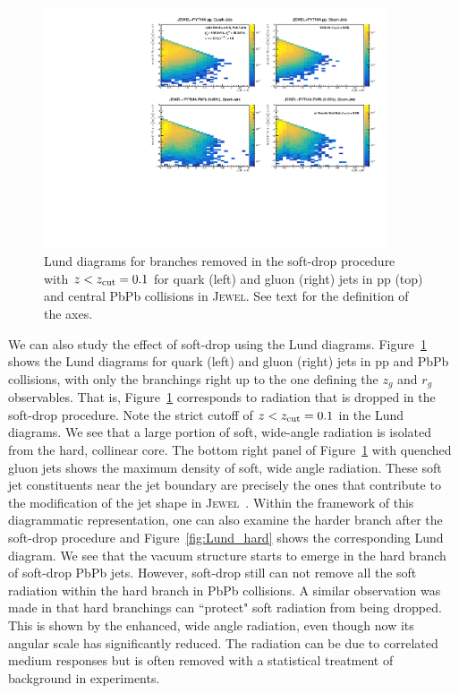 \documentclass[notoc,preprintnumbers]{JHEP3}
\newcommand{\jw}{\textsc{Jewel}~}
\begin{document}
\begin{figure}[t]
	\centering
	\includegraphics[width=0.9\textwidth]{Fig11}
	\caption{Lund diagrams for branches removed in the soft-drop procedure with $z<z_{\rm cut}=0.1$ for quark (left) and gluon (right) jets in pp (top) and central PbPb collisions in \textsc{Jewel}. See text for the definition of the axes.}
\label{fig:Lund_bkg}
\end{figure}

We can also study the effect of soft-drop using the Lund diagrams. Figure~\ref{fig:Lund_bkg} shows the Lund diagrams for quark (left) and gluon (right) jets in pp and PbPb collisions, with only the branchings right up to the one defining the $z_g$ and $r_g$ observables. That is, Figure~\ref{fig:Lund_bkg} corresponds to radiation that is dropped in the soft-drop procedure. Note the strict cutoff of $z < z_{\rm cut} = 0.1$ in the Lund diagrams. We see that a large portion of soft, wide-angle radiation is isolated from the hard, collinear core. The bottom right panel of Figure~\ref{fig:Lund_bkg} with quenched gluon jets shows the maximum density of soft, wide angle radiation. These soft jet constituents near the jet boundary are precisely the ones that contribute to the modification of the jet shape in \jw \cite{KunnawalkamElayavalli:2017hxo}. Within the framework of this diagrammatic representation, one can also examine the harder branch after the soft-drop procedure and Figure~\ref{fig:Lund_hard} shows the corresponding Lund diagram. We see that the vacuum structure starts to emerge in the hard branch of soft-drop PbPb jets. However, soft-drop still can not remove all the soft radiation within the hard branch in PbPb collisions. A similar observation was made in \cite{Hoang:2017kmk} that hard branchings can ``protect" soft radiation from being dropped. This is shown by the enhanced, wide angle radiation, even though now its angular scale has significantly reduced. The radiation can be due to correlated medium responses but is often removed with a statistical treatment of background in experiments.
\end{document}
